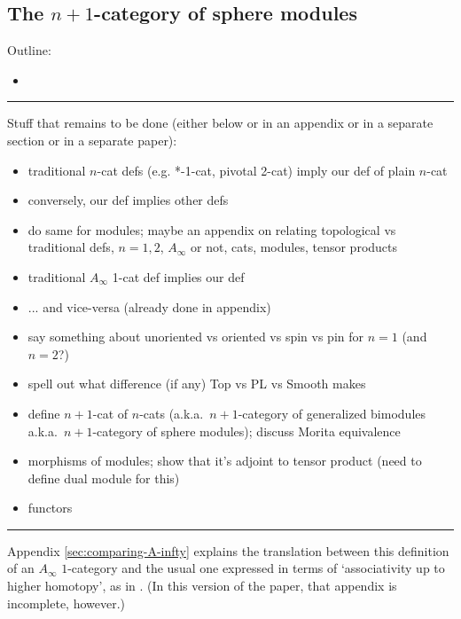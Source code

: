 \subsection{The $n{+}1$-category of sphere modules}



Outline:
\begin{itemize}
\item 
\end{itemize}



\medskip
\hrule
\medskip

\medskip


Stuff that remains to be done (either below or in an appendix or in a separate section or in
a separate paper):
\begin{itemize}
\item traditional $n$-cat defs (e.g. *-1-cat, pivotal 2-cat) imply our def of plain $n$-cat
\item conversely, our def implies other defs
\item do same for modules; maybe an appendix on relating topological
vs traditional defs, $n = 1,2$, $A_\infty$ or not, cats, modules, tensor products
\item traditional $A_\infty$ 1-cat def implies our def
\item ... and vice-versa (already done in appendix)
\item say something about unoriented vs oriented vs spin vs pin for $n=1$ (and $n=2$?)
\item spell out what difference (if any) Top vs PL vs Smooth makes
\item define $n{+}1$-cat of $n$-cats (a.k.a.\ $n{+}1$-category of generalized bimodules
a.k.a.\ $n{+}1$-category of sphere modules); discuss Morita equivalence
\item morphisms of modules; show that it's adjoint to tensor product
(need to define dual module for this)
\item functors
\end{itemize}

\hrule

Appendix \ref{sec:comparing-A-infty} explains the translation between this definition of an $A_\infty$ $1$-category and the usual one expressed in terms of `associativity up to higher homotopy', as in \cite{MR1854636}. (In this version of the paper, that appendix is incomplete, however.)

